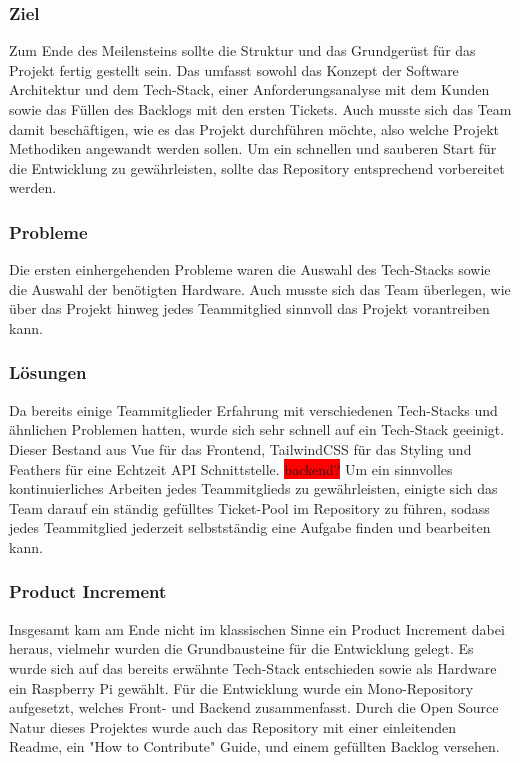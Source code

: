 \documentclass[10pt, a4paper, draft]{article}
\begin{document}
\subsubsection{Ziel}
Zum Ende des Meilensteins sollte die Struktur und das Grundgerüst für das Projekt fertig gestellt sein.
Das umfasst sowohl das Konzept der Software Architektur und dem Tech-Stack, einer Anforderungsanalyse mit dem Kunden sowie das Füllen des Backlogs mit den ersten Tickets.
Auch musste sich das Team damit beschäftigen, wie es das Projekt durchführen möchte, also welche Projekt Methodiken angewandt werden sollen.
Um ein schnellen und sauberen Start für die Entwicklung zu gewährleisten, sollte das Repository entsprechend vorbereitet werden.
\subsubsection{Probleme}
Die ersten einhergehenden Probleme waren die Auswahl des Tech-Stacks sowie die Auswahl der benötigten Hardware.
Auch musste sich das Team überlegen, wie über das Projekt hinweg jedes Teammitglied sinnvoll das Projekt vorantreiben kann.
\subsubsection{Lösungen}
Da bereits einige Teammitglieder Erfahrung mit verschiedenen Tech-Stacks und ähnlichen Problemen hatten, wurde sich sehr schnell auf ein Tech-Stack geeinigt.
Dieser Bestand aus Vue für das Frontend, TailwindCSS für das Styling und Feathers für eine Echtzeit API Schnittstelle. \colorbox{red}{backend?}
Um ein sinnvolles kontinuierliches Arbeiten jedes Teammitglieds zu gewährleisten, einigte sich das Team darauf ein ständig gefülltes Ticket-Pool im Repository zu führen, sodass jedes Teammitglied jederzeit selbstständig eine Aufgabe finden und bearbeiten kann.
\subsubsection{Product Increment}
Insgesamt kam am Ende nicht im klassischen Sinne ein Product Increment dabei heraus, vielmehr wurden die Grundbausteine für die Entwicklung gelegt.
Es wurde sich auf das bereits erwähnte Tech-Stack entschieden sowie als Hardware ein Raspberry Pi gewählt.
Für die Entwicklung wurde ein Mono-Repository aufgesetzt, welches Front- und Backend zusammenfasst.
Durch die Open Source Natur dieses Projektes wurde auch das Repository mit einer einleitenden Readme, ein "How to Contribute" Guide, und einem gefüllten Backlog versehen.
\end{document}
